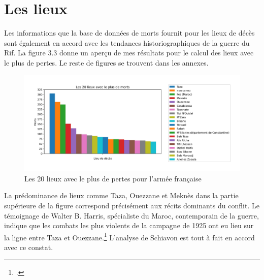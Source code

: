 \section{Les lieux}
Les informations que la base de données de morts fournit pour les lieux de décès sont également en accord avec les  tendances historiographiques de la guerre du Rif. La figure 3.3 donne un aperçu de mes résultats pour le calcul des lieux avec le plus de pertes. Le reste de figures se trouvent dans les annexes.\begin{figure}[H]
    \centering
    \includegraphics[scale=0.5]{Images/20places.jpg}
    \caption{Les 20 lieux avec le plus de pertes pour l'armée française}
    \label{fig:Morts par lieux}
\end{figure} 
La prédominance de lieux comme Taza, Ouezzane et Meknès dans la partie supérieure de la figure correspond précisément aux récits dominants du conflit. Le témoignage de Walter B. Harris, spécialiste du Maroc, contemporain de la guerre, indique que les combats les plus violents de la campagne de 1925 ont eu lieu sur la ligne entre Taza et Ouezzane.\footcites[226]{harris1925} L’analyse de Schiavon est tout à fait en accord avec ce constat. 

